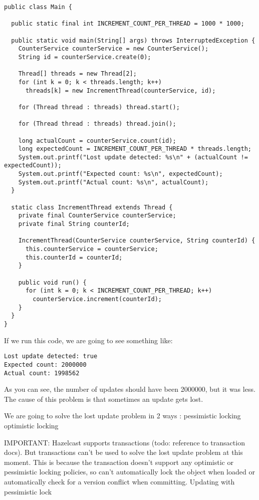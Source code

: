 \begin{verbatim}
public class Main {

  public static final int INCREMENT_COUNT_PER_THREAD = 1000 * 1000;

  public static void main(String[] args) throws InterruptedException {
    CounterService counterService = new CounterService();
    String id = counterService.create(0);

    Thread[] threads = new Thread[2];
    for (int k = 0; k < threads.length; k++)
      threads[k] = new IncrementThread(counterService, id);

    for (Thread thread : threads) thread.start();

    for (Thread thread : threads) thread.join();

    long actualCount = counterService.count(id);
    long expectedCount = INCREMENT_COUNT_PER_THREAD * threads.length;
    System.out.printf("Lost update detected: %s\n" + (actualCount != expectedCount));
    System.out.printf("Expected count: %s\n", expectedCount);
    System.out.printf("Actual count: %s\n", actualCount);
  }

  static class IncrementThread extends Thread {
    private final CounterService counterService;
    private final String counterId;

    IncrementThread(CounterService counterService, String counterId) {
      this.counterService = counterService;
      this.counterId = counterId;
    }

    public void run() {
      for (int k = 0; k < INCREMENT_COUNT_PER_THREAD; k++)
        counterService.increment(counterId);
    }
  }
}
\end{verbatim}

If we run this code, we are going to see something like:

\begin{verbatim}
Lost update detected: true
Expected count: 2000000
Actual count: 1998562
\end{verbatim}

As you can see, the number of updates should have been 2000000, but it was less. The cause of this problem is that sometimes an update gets lost.

We are going to solve the lost update problem in 2 ways :
pessimistic locking
optimistic locking

IMPORTANT: Hazelcast supports transactions (todo: reference to transaction docs). But transactions can't be used to solve the lost update problem at this moment. This is because the transaction doesn't support any optimistic or pessimistic locking policies, so can't automatically lock the object when loaded or automatically check for a version conflict when committing.
Updating with pessimistic lock

